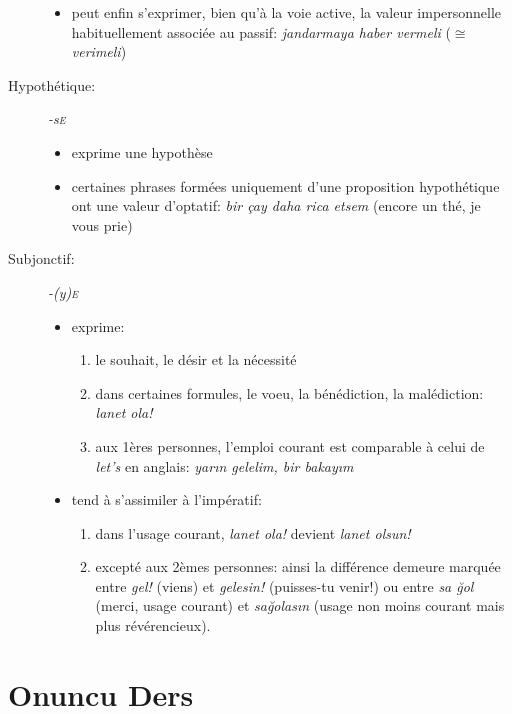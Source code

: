 \documentclass{cours}
\newcommand{\ug}{\u{g}}
\newcommand{\sce}{\textsc{e}}
\begin{document}
\begin{description}
\begin{itemize}
              \item peut enfin s'exprimer, bien qu'à la voie active, la valeur impersonnelle habituellement associée au passif: \textsl{jandarmaya haber vermeli} ($\cong$ \textsl{verimeli})
          \end{itemize}
    \item [Hypothétique:] \textsl{-s\sce}
          \begin{itemize}
              \item exprime une hypothèse
              \item certaines phrases formées uniquement d'une proposition hypothétique ont une valeur d'optatif: \textsl{bir çay daha rica etsem} (encore un thé, je vous prie)
          \end{itemize}
    \item [Subjonctif:] \textsl{-(y)\sce}
          \begin{itemize}
              \item exprime:
                    \begin{enumerate}
                        \item le souhait, le désir et la nécessité
                        \item dans certaines formules, le voeu, la bénédiction, la malédiction: \textsl{lanet ola!}
                        \item aux 1ères personnes, l'emploi courant est comparable à celui de \textsl{let's} en anglais: \textsl{yar\i n gelelim, bir bakay\i m}
                    \end{enumerate}
              \item tend à s'assimiler à l'impératif:
                    \begin{enumerate}
                        \item dans l'usage courant, \textsl{lanet ola!} devient \textsl{lanet olsun!}
                        \item excepté aux 2èmes personnes: ainsi la différence demeure marquée entre \textsl{gel!} (viens) et \textsl{gelesin!} (puisses-tu venir!) ou entre \textsl{sa \ug ol} (merci, usage courant) et \textsl{sa\ug olas\i n} (usage non moins courant mais plus révérencieux).
                    \end{enumerate}
          \end{itemize}
\end{description}
\section{Onuncu Ders}
\end{document}
